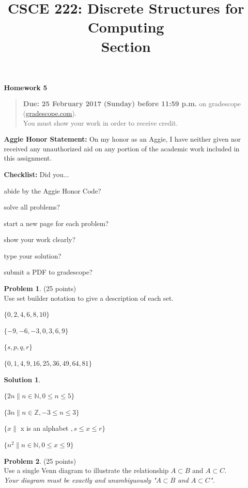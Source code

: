 \documentclass{article}
\title{CSCE 222: Discrete Structures for Computing\\Section \mysectionnumber\\\mysemester}
\author{\myname}
\date{}
\theoremstyle{definition}
\newtheorem{problem}{Problem}
\newtheorem*{solution}{Solution}
\newcommand{\honor}{\noindent \textbf{Aggie Honor Statement: }On my honor as an Aggie, I have neither
  given nor received any unauthorized aid on any portion of the academic work included in this assignment.
}
\newcommand{\checklist}{\noindent\textbf{Checklist:}
Did you...
\begin{compactenum}
\item abide by the Aggie Honor Code?
\item solve all problems?
\item start a new page for each problem?
\item show your work clearly?
\item type your solution?
\item submit a PDF to gradescope?
\end{compactenum}
}
\newcommand{\problemset}[1]{\begin{center}\textbf{Homework #1}\end{center}}
\newcommand{\duedate}[1]{\begin{quote}\textbf{Due: #1} on gradescope (\url{gradescope.com}). \\You must show your work in order to receive credit.\end{quote}}
\newcommand{\homeworknumber}[0]{5}
\begin{document}
\maketitle
\problemset{\homeworknumber}
\duedate{25 February 2017 (Sunday) before 11:59 p.m.}
\bigskip

\honor
\bigskip

\checklist

\begin{problem} (25 points)\\
Use set builder notation to give a description of each set.
\begin{compactenum}
\item $\{0,2,4,6,8,10\}$
\item $\{-9,-6,-3,0,3,6,9\}$
\item $\{s,p,q,r\}$
\item $\{0,1,4,9,16,25,36,49,64,81\}$
\end{compactenum}
\end{problem}

\begin{solution}\ \\
\begin{compactenum}
\item $\{2n \|n \in \mathbb{N} , 0 \leq n \leq 5 \}$\ \\
\item $\{3n \|n \in \mathbb{Z} , -3 \leq n \leq 3 \}$\ \\
\item $\{x \| $ x is an alphabet $,s \leq x \leq r \}$\ \\
\item $\{n^2 \| n \in \mathbb{N} , 0 \leq x \leq 9\}$\ \\
\end{compactenum}
\end{solution}

\newpage

\begin{problem}(25 points)\\ 
Use a single Venn diagram to illustrate the relationship $A \subset B$ and $A \subset C$.\\
\textit{Your diagram must be exactly and unambiguously "$A \subset B$ and $A \subset C$".}
\end{problem}
\end{document}
